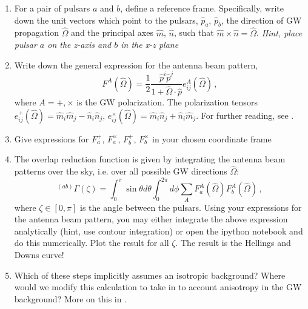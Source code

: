 \documentclass[article, onecolumn, ,nofootinbib,nopreprintnumbers]{revtex4}
\begin{document}
\begin{enumerate}
\item For a pair of pulsars $a$ and $b$, define a reference frame. Specifically, write down the unit vectors which point to the pulsars, $\hat{p}_a$, $\hat{p}_b$, the direction of GW propagation $\hat{\Omega}$ and the principal axes $\hat m$, $\hat n$, such that $\hat m\times \hat n = \hat \Omega$.  {\it Hint, place pulsar $a$ on the z-axis and $b$ in the x-z plane}

\item Write down the general expression for the antenna beam pattern, 
\begin{equation}
F^A(\hat \Omega) = \frac{1}{2} \frac{\hat p^i \hat p^j}{1+\hat\Omega\cdot\hat p} e^A_{ij}(\hat\Omega) \, ,  
\end{equation}
where $A=+,\times$ is the GW polarization. The polarization tensors $e^+_{ij}(\hat \Omega) = \hat m_i\hat m_j - \hat n_i \hat n_j$, $e^\times_{ij} (\hat \Omega)= \hat m_i \hat n_j + \hat n_i \hat m_j$. For further reading, see \cite{AllenRomano:1999, Anholm:09}. 


\item Give expressions for $F^+_a$, $F^\times_a$, $F^+_b$, $F^\times_b$ in your chosen coordinate frame
\item The overlap reduction function is given by integrating the antenna beam patterns over the sky, i.e. over all possible GW directions $\hat \Omega$:
\begin{equation}
^{(ab)}\Gamma(\zeta)=\int_0^\pi  \sin\theta d\theta \int_0^{2\pi} d\phi  \sum_A F^A_a(\hat \Omega) F^A_b(\hat \Omega) \, ,
\end{equation}
where $\zeta \in [0,\pi] $ is the angle between the pulsars. Using your expressions for the antenna beam pattern, you may either integrate the above expression analytically (hint, use contour integration) or open the ipython notebook and do this numerically. Plot the result for all $\zeta$. The result is the Hellings and Downs curve! 

\item Which of these steps implicitly assumes an isotropic background? Where would we modify this calculation to take in to account anisotropy in the GW background? More on this in \cite{MingarelliEtAl:2013}.
\end{enumerate}








\end{document}
